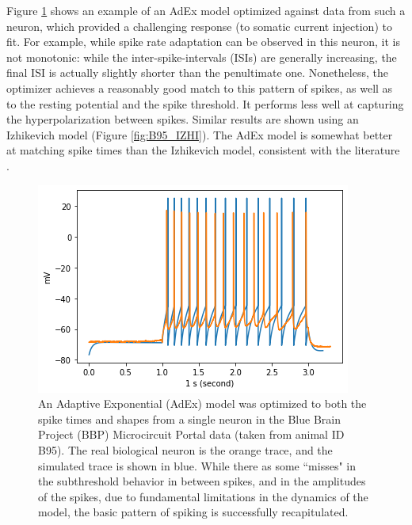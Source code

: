 Figure \ref{fig:B95Adexp} shows an example of an AdEx model optimized against data from such a neuron, which provided a challenging response (to somatic current injection) to fit.
For example, while spike rate adaptation can be observed in this neuron, it is not monotonic: while the inter-spike-intervals (ISIs) are generally increasing, the final ISI is actually slightly shorter than the penultimate one.
Nonetheless, the optimizer achieves a reasonably good match to this pattern of spikes, as well as to the resting potential and the spike threshold.
It performs less well at capturing the hyperpolarization between spikes.
Similar results are shown using an Izhikevich model (Figure \ref{fig:B95_IZHI}).
The AdEx model is somewhat better at matching spike times than the Izhikevich model, consistent with the literature \citep{rossant2011fitting}. 

\begin{figure}
    \centering
    \includegraphics[scale=0.75]{figures/bbp_multispiking_fit.png}
    \caption[Optimized AdEx model From BBP]{An Adaptive Exponential (AdEx) model was optimized to both the spike times and shapes from a single neuron in the Blue Brain Project (BBP) Microcircuit Portal data (taken from animal ID B95).
    The real biological neuron is the orange trace, and the simulated trace is shown in blue.
    While there as some ``misses" in the subthreshold behavior in between spikes, and in the amplitudes of the spikes, due to fundamental limitations in the dynamics of the model, the basic pattern of spiking is successfully recapitulated.}
    \label{fig:B95Adexp}
\end{figure}

